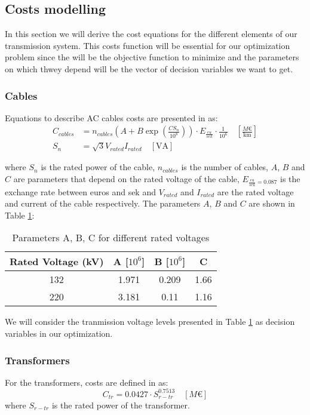 \documentclass[a4paper,11pt, titlepage, twoside]{article}
\begin{document}
\subsection{Costs modelling}

In this section we will derive the cost equations for the different elements of our transmission system. This costs function will be essential for our optimization problem since
the will be the objective function to minimize and the parameters on which thwey depend will be the vector of decision variables we want to get.
\subsubsection{Cables}

Equations to describe AC cables costs are presented in \cite{chalmers} as:
\begin{align}
    C_{cables} &= n_{cables} (A + B \exp(\frac{CS_n}{10^8})) \cdot E_{\frac{eu}{sek}} \cdot \frac{1}{10^6} \quad \left[\frac{M\euro}{\text{km}}\right] \\
    S_n &= \sqrt{3}V_{rated}I_{rated} \quad \left[\text{VA}\right]
\end{align}

where $S_n$ is the rated power of the cable, $n_{cables}$ is the number of cables, $A$, $B$ and $C$ are parameters that depend on the rated voltage of the cable, $E_{\frac{eu}{sek}=0.087}$ is the exchange rate between euros and sek and $V_{rated}$ and $I_{rated}$ are the rated voltage and current of the cable respectively.
The parameters $A$, $B$ and $C$ are shown in Table \ref{tab:parameterscab}:
\begin{table}[H]
    \centering
    \begin{tabular}{c|c|c|c}
    \hline
    \textbf{Rated Voltage (kV)} & \textbf{A [$10^6$]} & \textbf{B [$10^6$]} & \textbf{C} \\
    \hline
    132 & 1.971 & 0.209 & 1.66 \\
    220 & 3.181 & 0.11 & 1.16 \\
    \hline
    \end{tabular}
    \caption{Parameters A, B, C for different rated voltages \cite{chalmers}}
    \label{tab:parameterscab}
    \end{table}
We will consider the tranmission voltage levels presented in Table \ref{tab:parameterscab} as decision variables in our optimization.


\subsubsection{Transformers}
For the transformers, costs are defined in \cite{costraf} as:
\begin{equation}
    C_{tr}= 0.0427 \cdot S_{r-tr}^{0.7513} \quad \left[M\euro\right]
\end{equation}
where $S_{r-tr}$ is the rated power of the transformer.
\end{document}
